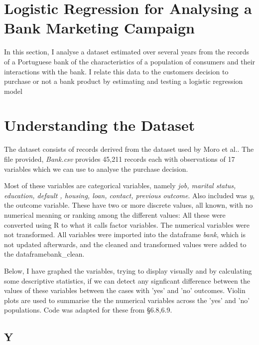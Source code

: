 \documentclass[9pt,technote]{IEEEtran}
\begin{document}

\section{Logistic Regression for Analysing a Bank Marketing Campaign}

In this section, I analyse a dataset estimated over several years from the records of a Portuguese bank of the characteristics of a population of consumers and their interactions with the bank.  I relate this data to the customers decision to purchase or not a bank product by estimating and testing a logistic regression model   

\section{Understanding the Dataset}

The dataset consists of records derived from the dataset used by Moro et al.\cite{moro14}.  The file provided, \textit{Bank.csv} provides 45,211 records each with observations of 17 variables which we can use to analyse the purchase decision.  

Most of these variables are categorical variables, namely \textit{job, marital status, education, default , housing, loan, contact, previous outcome}.  Also included was \textit{y}, the outcome variable.  These have two or more discrete values, all known, with no numerical meaning or ranking among the different values: All these were converted using R to what it calls factor variables.  The numerical variables were not transformed.  All variables were imported into the dataframe \textit{bank}, which is not updated afterwards, and the cleaned and transformed values were added to the dataframe{bank\_clean}.  

Below, I have graphed the variables, trying to display visually and by calculating some descriptive statistics, if we can detect any signficant difference between the values of these variables between the cases with 'yes' and 'no' outcomes.  Violin plots are used to summarise the the numerical variables across the 'yes' and 'no' populations.  Code was adapted for these from \cite{chang19} \S 6.8,6.9. 

\subsection{Y} 
\end{document}
